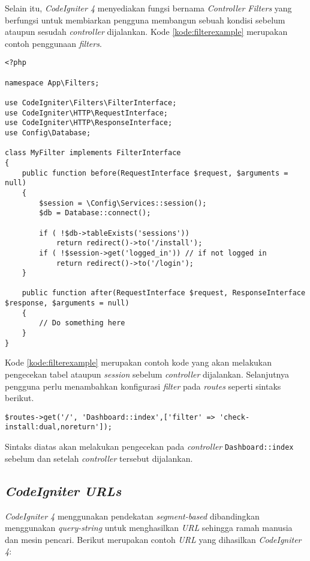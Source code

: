 Selain itu, \textit{CodeIgniter 4} menyediakan fungsi bernama \textit{Controller Filters} yang berfungsi untuk membiarkan pengguna membangun sebuah kondisi sebelum ataupun sesudah \textit{controller} dijalankan. Kode \ref{kode:filterexample} merupakan contoh penggunaan \textit{filters}.

\begin{lstlisting}[caption=Contoh \textit{Controllers Filters} pada \textit{CodeIgniter 4},label=kode:filterexample]
<?php

namespace App\Filters;

use CodeIgniter\Filters\FilterInterface;
use CodeIgniter\HTTP\RequestInterface;
use CodeIgniter\HTTP\ResponseInterface;
use Config\Database;

class MyFilter implements FilterInterface
{
    public function before(RequestInterface $request, $arguments = null)
    {
        $session = \Config\Services::session();
        $db = Database::connect();

        if ( !$db->tableExists('sessions'))
			return redirect()->to('/install');
		if ( !$session->get('logged_in')) // if not logged in
			return redirect()->to('/login');
    }

    public function after(RequestInterface $request, ResponseInterface $response, $arguments = null)
    {
        // Do something here
    }
}
\end{lstlisting}

Kode \ref{kode:filterexample} merupakan contoh kode yang akan melakukan pengecekan tabel ataupun \textit{session} sebelum \textit{controller} dijalankan. Selanjutnya pengguna perlu menambahkan konfigurasi \textit{filter } pada \textit{routes} seperti sintaks berikut.
\begin{center}
	\verb|$routes->get('/', 'Dashboard::index',['filter' => 'check-install:dual,noreturn']);|
\end{center}

Sintaks diatas akan melakukan pengecekan pada \textit{controller} \texttt{Dashboard::index} sebelum dan setelah \textit{controller} tersebut dijalankan.

\subsection{\textit{CodeIgniter URLs}}
\textit{CodeIgniter 4} menggunakan pendekatan \textit{segment-based} dibandingkan menggunakan \textit{query-string} untuk menghasilkan \textit{URL} sehingga ramah manusia dan mesin pencari. Berikut merupakan contoh \textit{URL} yang dihasilkan \textit{CodeIgniter 4}:

